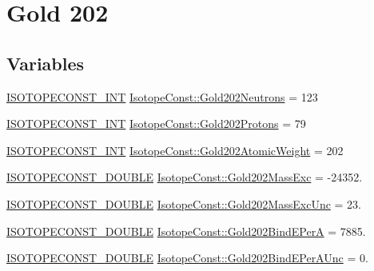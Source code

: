 \hypertarget{group___isotope_const-_gold-_au202}{}\section{Gold 202}
\label{group___isotope_const-_gold-_au202}
\subsection*{Variables}
\begin{DoxyCompactItemize}
\item 
\mbox{\hyperlink{group___isotope_const-_macros_ga5f18360b3e99483a35c32d789e62621c}{I\+S\+O\+T\+O\+P\+E\+C\+O\+N\+S\+T\+\_\+\+I\+NT}} \mbox{\hyperlink{group___isotope_const-_gold-_au202_ga5f01183640d2bcec6f9598e771754828}{Isotope\+Const\+::\+Gold202\+Neutrons}} = 123
\item 
\mbox{\hyperlink{group___isotope_const-_macros_ga5f18360b3e99483a35c32d789e62621c}{I\+S\+O\+T\+O\+P\+E\+C\+O\+N\+S\+T\+\_\+\+I\+NT}} \mbox{\hyperlink{group___isotope_const-_gold-_au202_ga78fb995402167d828d545c2cb603f09c}{Isotope\+Const\+::\+Gold202\+Protons}} = 79
\item 
\mbox{\hyperlink{group___isotope_const-_macros_ga5f18360b3e99483a35c32d789e62621c}{I\+S\+O\+T\+O\+P\+E\+C\+O\+N\+S\+T\+\_\+\+I\+NT}} \mbox{\hyperlink{group___isotope_const-_gold-_au202_gae1412b2720323af2b7d07f9ec93c11fa}{Isotope\+Const\+::\+Gold202\+Atomic\+Weight}} = 202
\item 
\mbox{\hyperlink{group___isotope_const-_macros_ga8f45a7272ce02c0b4c65c44636ed719a}{I\+S\+O\+T\+O\+P\+E\+C\+O\+N\+S\+T\+\_\+\+D\+O\+U\+B\+LE}} \mbox{\hyperlink{group___isotope_const-_gold-_au202_gac7eb0fde83228f63f077c18ec447e559}{Isotope\+Const\+::\+Gold202\+Mass\+Exc}} = -\/24352.
\item 
\mbox{\hyperlink{group___isotope_const-_macros_ga8f45a7272ce02c0b4c65c44636ed719a}{I\+S\+O\+T\+O\+P\+E\+C\+O\+N\+S\+T\+\_\+\+D\+O\+U\+B\+LE}} \mbox{\hyperlink{group___isotope_const-_gold-_au202_gac8d4f686e4ece0116f3bc06b8edf2d6e}{Isotope\+Const\+::\+Gold202\+Mass\+Exc\+Unc}} = 23.
\item 
\mbox{\hyperlink{group___isotope_const-_macros_ga8f45a7272ce02c0b4c65c44636ed719a}{I\+S\+O\+T\+O\+P\+E\+C\+O\+N\+S\+T\+\_\+\+D\+O\+U\+B\+LE}} \mbox{\hyperlink{group___isotope_const-_gold-_au202_ga98036da49e67dac0a0a5675b54fd26f6}{Isotope\+Const\+::\+Gold202\+Bind\+E\+PerA}} = 7885.
\item 
\mbox{\hyperlink{group___isotope_const-_macros_ga8f45a7272ce02c0b4c65c44636ed719a}{I\+S\+O\+T\+O\+P\+E\+C\+O\+N\+S\+T\+\_\+\+D\+O\+U\+B\+LE}} \mbox{\hyperlink{group___isotope_const-_gold-_au202_ga2e2dcf8d279f8bb9b8e25315ae765941}{Isotope\+Const\+::\+Gold202\+Bind\+E\+Per\+A\+Unc}} = 0.

\end{DoxyCompactItemize}
